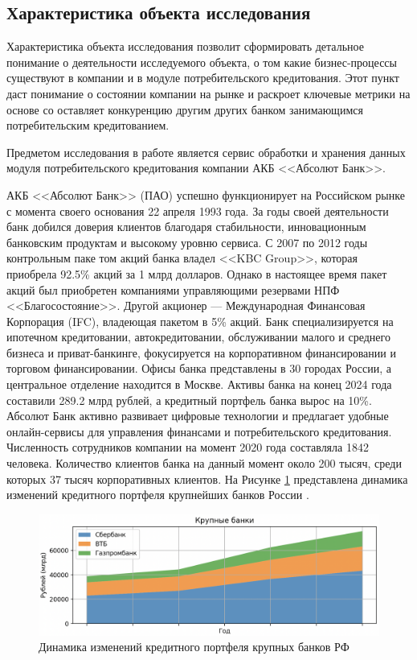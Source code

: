 \documentclass[14pt, a4paper]{extarticle}
\begin{document}
\subsection{Характеристика объекта исследования}

Характеристика объекта исследования позволит сформировать детальное понимание
о деятельности исследуемого объекта, о том какие бизнес-процессы существуют в
компании и в модуле потребительского кредитования. Этот пункт даст понимание о
состоянии компании на рынке и раскроет ключевые метрики на основе со
оставляет конкуренцию другим других банком занимающимся потребительским
кредитованием.

Предметом исследования в работе является сервис обработки и хранения данных
модуля потребительского кредитования компании АКБ <<Абсолют Банк>>.

АКБ <<Абсолют Банк>> (ПАО) успешно функционирует на Российском рынке с момента
своего основания 22 апреля 1993 года. За годы своей деятельности банк добился
доверия клиентов благодаря стабильности, инновационным банковским продуктам и
высокому уровню сервиса. С 2007 по 2012 годы контрольным паке том акций банка
владел <<KBC Group>>, которая приобрела 92.5\% акций за 1 млрд долларов. Однако
в настоящее время пакет акций был приобретен компаниями управляющими резервами
НПФ <<Благосостояние>>. Другой акционер — Международная Финансовая Корпорация
(IFC), владеющая пакетом в 5\% акций. Банк специализируется на ипотечном
кредитовании, автокредитовании, обслуживании малого и среднего бизнеса и
приват-банкинге, фокусируется на корпоративном финансировании и торговом
финансировании. Офисы банка представлены в 30 городах России, а центральное
отделение находится в Москве. Активы банка на конец 2024 года составили 289.2
млрд рублей, а кредитный портфель банка вырос на 10\%. Абсолют Банк активно
развивает цифровые технологии и предлагает удобные онлайн-сервисы для
управления финансами и потребительского кредитования. Численность сотрудников
компании на момент 2020 года составляла 1842 человека. Количество клиентов
банка на данный момент около 200 тысяч, среди которых 37 тысяч корпоративных
клиентов. На Рисунке \ref{fig:кредитный_портфель_банков_крупные} представлена
динамика изменений кредитного портфеля крупнейших банков России
\cite{banks-rating}.

\begin{figure}[H]
	\centering
	\includegraphics[width=\textwidth]{кредитный_портфель_банков_крупные}
	\caption{Динамика изменений кредитного портфеля крупных банков РФ}
	\label{fig:кредитный_портфель_банков_крупные}
\end{figure}
\end{document}
